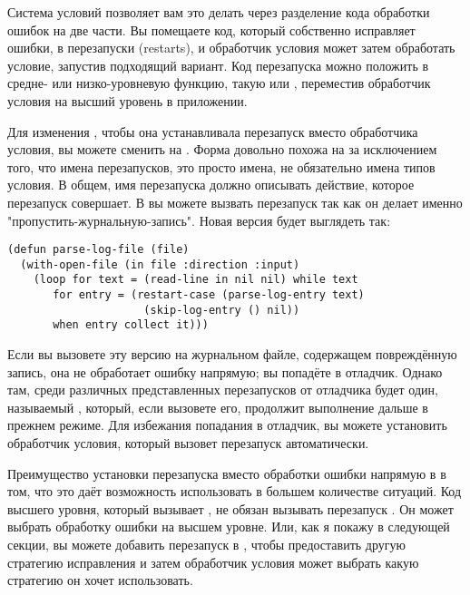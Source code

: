 Система условий позволяет вам это делать через разделение кода обработки ошибок на две
части. Вы помещаете код, который собственно исправляет ошибки, в перезапуски (restarts), и
обработчик условия может затем обработать условие, запустив подходящий вариант. Код
перезапуска можно положить в средне- или низко-уровневую функцию, такую
 или , переместив обработчик условия на высший
уровень в приложении.

Для изменения , чтобы она устанавливала перезапуск вместо обработчика
условия, вы можете сменить  на . Форма
 довольно похожа на  за исключением того, что имена
перезапусков, это просто имена, не обязательно имена типов условия. В общем, имя
перезапуска должно описывать действие, которое перезапуск совершает. В
 вы можете вызвать перезапуск  так как он делает
именно "пропустить-журнальную-запись". Новая версия будет выглядеть так:

\begin{lstlisting}
(defun parse-log-file (file)
  (with-open-file (in file :direction :input)
    (loop for text = (read-line in nil nil) while text
       for entry = (restart-case (parse-log-entry text)
                     (skip-log-entry () nil))
       when entry collect it)))
\end{lstlisting}

Если вы вызовете эту версию  на журнальном файле, содержащем
повреждённую запись, она не обработает ошибку напрямую; вы попадёте в отладчик. Однако
там, среди различных представленных перезапусков от отладчика будет один, называемый
, который, если вызовете его, продолжит выполнение
 дальше в прежнем режиме. Для избежания попадания в отладчик, вы
можете установить обработчик условия, который вызовет перезапуск 
автоматически.

Преимущество установки перезапуска вместо обработки ошибки напрямую в
 в том, что это даёт возможность использовать  в
большем количестве ситуаций. Код высшего уровня, который вызывает ,
не обязан вызывать перезапуск . Он может выбрать обработку ошибки на
высшем уровне. Или, как я покажу в следующей секции, вы можете добавить перезапуск в
, чтобы предоставить другую стратегию исправления и затем обработчик
условия может выбрать какую стратегию он хочет использовать.


